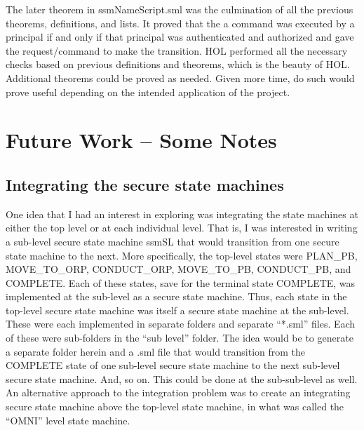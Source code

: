 The later theorem in ssmNameScript.sml was the culmination of all the previous theorems,
definitions, and lists. It proved that the a command was executed by a principal if and
only if that principal was authenticated and authorized and gave the request/command to
make the transition. HOL performed all the necessary checks based on previous definitions
and theorems, which is the beauty of HOL. Additional theorems could be proved as needed.
Given more time, do such would prove useful depending on the intended application of the project.


\chapter{Future Work -- Some Notes}
\label{cha:future-work-some}


\section{Integrating the secure state machines}
\label{sec:integr-secure-state-1}

One idea that I had an interest in exploring was integrating the state machines at
either the top level or at each individual level. That is, I was interested in writing
a sub-level secure state machine ssmSL that would transition from one secure state
machine to the next. More specifically, the top-level states were PLAN_PB, MOVE_TO_ORP,
CONDUCT_ORP, MOVE_TO_PB, CONDUCT_PB, and COMPLETE. Each of these states, save for the
terminal state COMPLETE, was implemented at the sub-level as a secure state machine.
Thus, each state in the top-level secure state machine was itself a secure state machine
at the sub-level. These were each implemented in separate folders and separate “*.sml”
files. Each of these were sub-folders in the “sub level” folder. The idea would be to
generate a separate folder herein and a .sml file that would transition from the COMPLETE
state of one sub-level secure state machine to the next sub-level secure state machine.
And, so on. This could be done at the sub-sub-level as well. An alternative approach to
the integration problem was to create an integrating secure state machine above the top-level
state machine, in what was called the “OMNI” level state machine.

